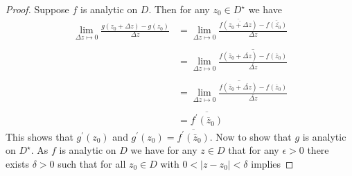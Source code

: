 \documentclass[letter,12pt]{article}
\begin{document}
\begin{proof}
    Suppose $f$ is analytic on $D$. Then for any $z_0\in D^\star$ we have \begin{align*}
    \lim_{\Delta z\mapsto 0} \frac{g(z_0+\Delta z)-g(z_0)}{\Delta z } &= \lim_{\Delta z\mapsto 0} \frac{\overline{f(\overline{z_0+\Delta z})}-\overline{f(\overline{z_0})}}{\Delta z }\\ \\
    &= \lim_{\Delta z\mapsto 0}\overline{\frac{f(\bar z_0 + \overline{\Delta z})- f(\overline z_0)}{\overline {\Delta z}}}\\ \\
    &= \overline{\lim_{\Delta z\mapsto 0}\frac{f(\bar z_0 + \overline{\Delta z})- f(\overline z_0)}{\overline {\Delta z}}}\\ \\
    &= \overline{f^\prime(\overline z_0)}
    \end{align*}
This shows that $g^\prime(z_0)$ and $g^\prime(z_0)=\overline{f^\prime (\bar z_0)}$. 
Now to show that $g$ is analytic on $D^\star$. As $f$ is analytic on $D$ we have for any $z\in D$ that for any $\epsilon>0$ there exists $\delta >0$ such that for all $z_0\in D$ with $0< |z-z_0|<\delta$ implies  
\end{proof}
\end{document}
